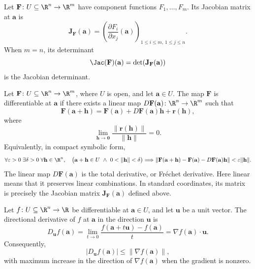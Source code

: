     \begin{definition}
        Let $\mathbf{F}\colon U\subseteq\R^n\to\R^m$ have component functions
        $F_1,\dots,F_m$. Its Jacobian matrix at $\mathbf{a}$ is
        \[
            \mathbf{J}_{\mathbf{F}}(\mathbf{a})
            =
            \left(\frac{\partial F_i}{\partial x_j}(\mathbf{a})\right)
            _{1\leq i\leq m,\,1\leq j\leq n}.
        \]
        When $m=n$, its determinant
        \[
            \Jac(\mathbf{F})(\mathbf{a})
            =
            \det\!\left(\mathbf{J}_{\mathbf{F}}(\mathbf{a})\right)
        \]
        is the Jacobian determinant.
    \end{definition}

    \begin{definition}
        Let $\mathbf{F}\colon U\subseteq\R^n\to\R^m$, where $U$ is open, and
        let $\mathbf{a}\in U$. The map $\mathbf{F}$ is differentiable at
        $\mathbf{a}$ if there exists a linear map
        $D\mathbf{F}(\mathbf{a})\colon\R^n\to\R^m$ such that
        \[
            \mathbf{F}(\mathbf{a}+\mathbf{h})
            =
            \mathbf{F}(\mathbf{a})
            +D\mathbf{F}(\mathbf{a})\mathbf{h}
            +\mathbf{r}(\mathbf{h}),
        \]
        where
        \[
            \lim\limits_{\mathbf{h}\to\mathbf{0}}
            \frac{\|\mathbf{r}(\mathbf{h})\|}{\|\mathbf{h}\|}
            =0.
        \]
        Equivalently, in compact symbolic form,
        {\small
        \[
            \forall\varepsilon>0\;\exists\delta>0\;\forall\mathbf{h}\in\R^n,
            \quad
            \bigl(\mathbf{a}+\mathbf{h}\in U\ \land\ 0<\|\mathbf{h}\|<\delta\bigr)
            \Longrightarrow
            \|\mathbf{F}(\mathbf{a}+\mathbf{h})-\mathbf{F}(\mathbf{a})
            -D\mathbf{F}(\mathbf{a})\mathbf{h}\|<\varepsilon\|\mathbf{h}\|.
        \]
        }
        The linear map $D\mathbf{F}(\mathbf{a})$ is the total derivative, or
        Fr\'echet derivative. Here linear means that it preserves linear
        combinations. In standard coordinates, its matrix is precisely the
        Jacobian matrix $\mathbf{J}_{\mathbf{F}}(\mathbf{a})$ defined above.
    \end{definition}


    \begin{definition}
        Let $f\colon U\subseteq\R^n\to\R$ be differentiable at
        $\mathbf{a}\in U$, and let $\mathbf{u}$ be a unit vector. The
        directional derivative of $f$ at $\mathbf{a}$ in the direction
        $\mathbf{u}$ is
        \[
            D_{\mathbf{u}}f(\mathbf{a})
            =
            \lim\limits_{t\to0}
            \frac{f(\mathbf{a}+t\mathbf{u})-f(\mathbf{a})}{t}
            =
            \nabla f(\mathbf{a})\cdot\mathbf{u}.
        \]
        Consequently,
        \[
            |D_{\mathbf{u}}f(\mathbf{a})|
            \leq
            \|\nabla f(\mathbf{a})\|,
        \]
        with maximum increase in the direction of
        $\nabla f(\mathbf{a})$ when the gradient is nonzero.
    \end{definition}

